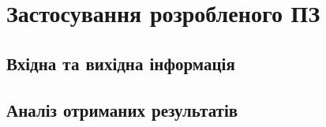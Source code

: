 \section{Застосування розробленого ПЗ}
\subsection{Вхідна та вихідна інформація}
\subsection{Аналіз отриманих результатів}
